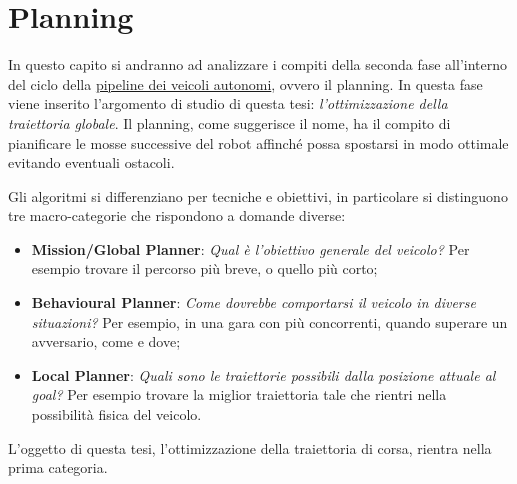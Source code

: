 
\chapter{Planning}
\label{chap:plan}

In questo capito si andranno ad analizzare i compiti della seconda fase all'interno del ciclo della
\hyperref[sec:pipeline]{pipeline dei veicoli autonomi}, ovvero il planning. In questa fase viene inserito
l'argomento di studio di questa tesi: \textit{l'ottimizzazione della traiettoria globale}.
Il planning, come suggerisce il nome, ha il compito di pianificare le mosse successive del robot affinché
possa spostarsi in modo ottimale evitando eventuali ostacoli.

\bigskip
\noindent Gli algoritmi si differenziano per tecniche e obiettivi, in particolare si distinguono tre
macro-categorie che rispondono a domande diverse:
\begin{itemize}
	\item \textbf{Mission/Global Planner}: \textit{Qual è l'obiettivo generale del veicolo?} Per esempio trovare
	il percorso più breve, o quello più corto; 
	\item \textbf{Behavioural Planner}: \textit{Come dovrebbe comportarsi il veicolo in diverse situazioni?} Per
	esempio, in una gara con più concorrenti, quando superare un avversario, come e dove;
	\item \textbf{Local Planner}: \textit{Quali sono le traiettorie possibili dalla posizione attuale al goal?}
	Per esempio trovare la miglior traiettoria tale che rientri nella possibilità fisica del veicolo.
\end{itemize}
L'oggetto di questa tesi, l'ottimizzazione della traiettoria di corsa, rientra nella prima categoria.

